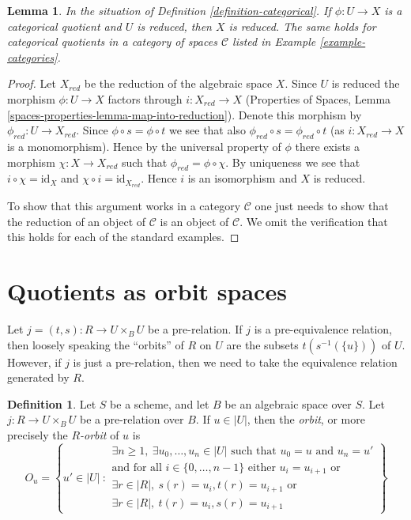 \documentclass{stacks-project}
\theoremstyle{plain}
\newtheorem{lemma}[subsection]{Lemma}
\theoremstyle{definition}
\newtheorem{definition}[subsection]{Definition}
\theoremstyle{remark}
\numberwithin{equation}{subsection}
\begin{document}
\begin{lemma}
\label{lemma-categorical-reduced}
In the situation of
Definition \ref{definition-categorical}.
If $\phi : U \to X$ is a categorical quotient and $U$ is reduced,
then $X$ is reduced. The same holds for categorical quotients in
a category of spaces $\mathcal{C}$ listed in
Example \ref{example-categories}.
\end{lemma}

\begin{proof}
Let $X_{red}$ be the reduction of the algebraic space $X$.
Since $U$ is reduced the morphism $\phi : U \to X$ factors through
$i : X_{red} \to X$ (Properties of Spaces, Lemma
\ref{spaces-properties-lemma-map-into-reduction}). Denote this morphism
by $\phi_{red} : U \to X_{red}$. Since $\phi \circ s = \phi \circ t$ we
see that also $\phi_{red} \circ s = \phi_{red} \circ t$ (as
$i : X_{red} \to X$ is a monomorphism). Hence by the universal property
of $\phi$ there exists a morphism $\chi : X \to X_{red}$ such that
$\phi_{red} = \phi \circ \chi$. By uniqueness we see that
$i \circ \chi = \text{id}_X$ and $\chi \circ i = \text{id}_{X_{red}}$.
Hence $i$ is an isomorphism and $X$ is reduced.

\medskip\noindent
To show that this argument works in a category $\mathcal{C}$ one
just needs to show that the reduction of an object of $\mathcal{C}$
is an object of $\mathcal{C}$. We omit the verification that this
holds for each of the standard examples.
\end{proof}





\section{Quotients as orbit spaces}
\label{section-orbits}

\noindent
Let $j = (t, s) : R \to U \times_B U$ be a pre-relation.
If $j$ is a pre-equivalence relation, then loosely speaking
the ``orbits'' of $R$ on $U$
are the subsets $t(s^{-1}(\{u\}))$ of $U$. However, if $j$ is just a
pre-relation, then we need to take the equivalence relation generated
by $R$.

\begin{definition}
\label{definition-orbit}
Let $S$ be a scheme, and let $B$ be an algebraic space over $S$.
Let $j : R \to U \times_B U$ be a pre-relation over $B$.
If $u \in |U|$, then the {\it orbit}, or more precisely the
{\it $R$-orbit} of $u$ is
$$
O_u =
\left\{
u' \in |U|\ :
\begin{matrix}
\exists n \geq 1, \ \exists u_0, \ldots, u_n \in |U|\text{ such that }
u_0 = u \text{ and } u_n = u' \\
\text{and for all }i \in \{0, \ldots, n - 1\}\text{ either }
u_i = u_{i + 1}\text{ or } \\
\exists r \in |R|, \ s(r) = u_i, t(r) = u_{i + 1}
\text{ or } \\
\exists r \in |R|, \ t(r) = u_i, s(r) = u_{i + 1}
\end{matrix}
\right\}
$$
\end{definition}
\end{document}
